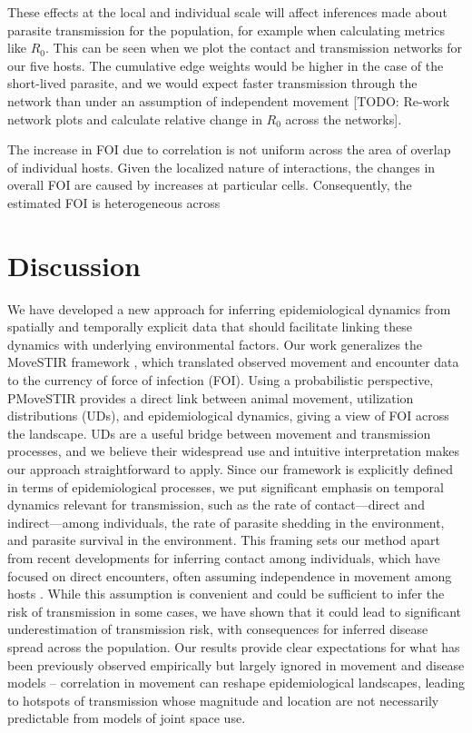\documentclass[letterpaper]{article}
\begin{document}
These effects at the local and individual scale will affect inferences made about parasite transmission for the population, for example when calculating metrics like $R_0$. This can be seen when we plot the contact and transmission networks for our five hosts. The cumulative edge weights would be higher in the case of the short-lived parasite, and we would expect faster transmission through the network than under an assumption of independent movement [TODO: Re-work network plots and calculate relative change in $R_0$ across the networks]. 

The increase in FOI due to correlation is not uniform across the area of overlap of individual hosts. Given the localized nature of interactions, the changes in overall FOI are caused by increases at particular cells. Consequently, the estimated FOI is heterogeneous across

\section*{Discussion}

We have developed a new approach for inferring epidemiological dynamics from spatially and temporally explicit data that should facilitate linking these dynamics with underlying environmental factors. Our work generalizes the MoveSTIR framework \citep{Wilber2022}, which translated observed movement and encounter data to the currency of force of infection (FOI). Using a probabilistic perspective, PMoveSTIR provides a direct link between animal movement, utilization distributions (UDs), and epidemiological dynamics, giving a view of FOI across the landscape. UDs are a useful bridge between movement and transmission processes, and we believe their widespread use and intuitive interpretation makes our approach straightforward to apply.
Since our framework is explicitly defined in terms of epidemiological processes, we put significant emphasis on temporal dynamics relevant for transmission, such as the rate of contact---direct and indirect---among individuals, the rate of parasite shedding in the environment, and parasite survival in the environment. 
This framing sets our method apart from recent developments for inferring contact among individuals, which have focused on direct encounters, often assuming independence in movement among hosts \citep{Noonan2021,Das2023}. While this assumption is convenient and could be sufficient to infer the risk of transmission in some cases, we have shown that it could lead to significant underestimation of transmission risk, with consequences for inferred disease spread across the population. Our results provide clear expectations for what has been previously observed empirically but largely ignored in movement and disease models -- correlation in movement can reshape epidemiological landscapes, leading to hotspots of transmission whose magnitude and location are not necessarily predictable from models of joint space use.
\end{document}
